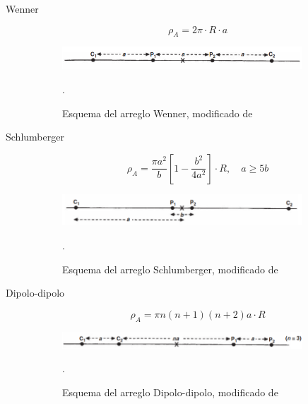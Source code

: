 				\begin{description}
					\item[Wenner ]  
							\begin{equation}
								\rho_{A} = 2\pi \cdot R \cdot a
							\end{equation}
							
							\begin{figure}[h!]
								\centering
								\includegraphics[width=9cm]{Imagenes/1}
								\caption[Esquema del arreglo Wenner]{Esquema del arreglo Wenner, modificado de \citet{reynolds2011}}.
								\label{fig:AW}
							\end{figure}
							
					\item[Schlumberger ] 
					
						\begin{equation}
							\rho_{A} = \frac{\pi a^{2}}{b} \left[ 1 - \frac{b^{2}}{4 a^{2}} \right] \cdot R, \quad a \geq 5b
						\end{equation}

							\begin{figure}[h!]
								\centering
								\includegraphics[width=9cm]{Imagenes/2}
								\caption[Esquema del arreglo Schlumberger]{Esquema del arreglo Schlumberger, modificado de \citet{reynolds2011}}.
								\label{fig:AS}
							\end{figure}
					
					\item[Dipolo-dipolo]  
					
							\begin{equation}
								\rho_{A} = \pi n(n+1)(n+2)a \cdot R
							\end{equation}
					
							\begin{figure}[h!]
								\centering
								\includegraphics[width=9cm]{Imagenes/3}
								\caption[Esquema del arreglo Dipolo-dipolo]{Esquema del arreglo Dipolo-dipolo, modificado de \citet{reynolds2011}}.
								\label{fig:ADD}
							\end{figure}
				\end{description}
	
